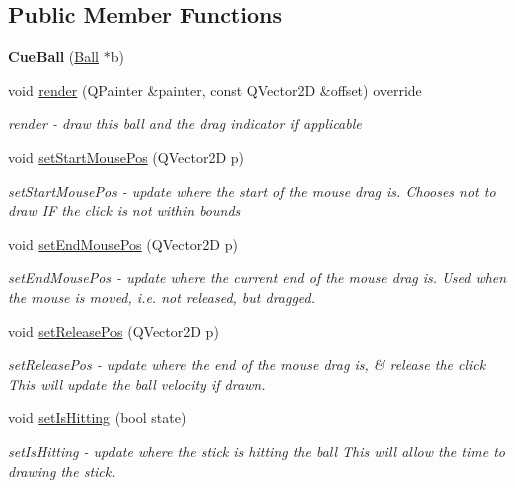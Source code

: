 \subsection*{Public Member Functions}
\begin{DoxyCompactItemize}
\item 
\mbox{\label{class_cue_ball_a9a5dd540283fcd724b7f1a3bce11fbf0}} 
{\bfseries Cue\+Ball} (\mbox{\hyperlink{class_ball}{Ball}} $\ast$b)
\item 
void \mbox{\hyperlink{class_cue_ball_a915a83205e4cfc720fbd884b045e2f81}{render}} (Q\+Painter \&painter, const Q\+Vector2D \&offset) override
\begin{DoxyCompactList}\small\item\em render -\/ draw this ball and the drag indicator if applicable \end{DoxyCompactList}\item 
void \mbox{\hyperlink{class_cue_ball_aa6165c3e37540234b621402e02c1c97c}{set\+Start\+Mouse\+Pos}} (Q\+Vector2D p)
\begin{DoxyCompactList}\small\item\em set\+Start\+Mouse\+Pos -\/ update where the start of the mouse drag is. Chooses not to draw IF the click is not within bounds \end{DoxyCompactList}\item 
void \mbox{\hyperlink{class_cue_ball_a297112b81595f308f717410f74d03d3c}{set\+End\+Mouse\+Pos}} (Q\+Vector2D p)
\begin{DoxyCompactList}\small\item\em set\+End\+Mouse\+Pos -\/ update where the current end of the mouse drag is. Used when the mouse is moved, i.\+e. not released, but dragged. \end{DoxyCompactList}\item 
void \mbox{\hyperlink{class_cue_ball_a8aafe19b8226adfcca93621baeef29f4}{set\+Release\+Pos}} (Q\+Vector2D p)
\begin{DoxyCompactList}\small\item\em set\+Release\+Pos -\/ update where the end of the mouse drag is, \& release the click This will update the ball velocity if drawn. \end{DoxyCompactList}\item 
void \mbox{\hyperlink{class_cue_ball_aaab036efaf9d498af1a70cf3e68db11e}{set\+Is\+Hitting}} (bool state)
\begin{DoxyCompactList}\small\item\em set\+Is\+Hitting -\/ update where the stick is hitting the ball This will allow the time to drawing the stick. \end{DoxyCompactList}\item 

\end{DoxyCompactItemize}
